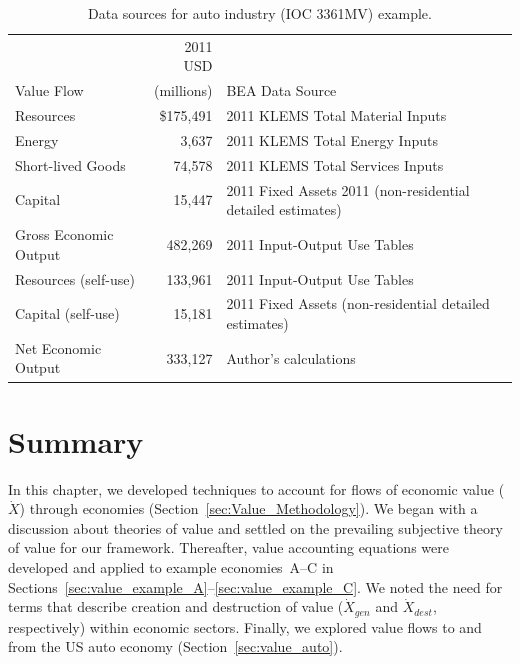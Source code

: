 \begin{table}
\caption[Data Sources for auto industry (IOC 3361MV) example]{Data sources for auto industry (IOC 3361MV) example.}
\begin{center}
  \begin{tabular}{l r @{\hspace{2em}} l}
   \toprule 
     & 2011 USD &   \\ 
Value Flow & (millions) & BEA Data Source \\
	\midrule
    Resources  & \$175,491           & 2011 KLEMS Total Material Inputs \\

   Energy &   3,637&   2011 KLEMS Total Energy Inputs                \\

    Short-lived Goods &   74,578 &   2011 KLEMS Total Services Inputs    \\
    Capital &  15,447  &  2011 Fixed Assets 2011 (non-residential detailed estimates)     \\  

    Gross Economic Output & 482,269  &   2011 Input-Output Use Tables \\

    Resources (self-use)  &  133,961 & 2011 Input-Output Use Tables     \\
    Capital (self-use) & 15,181 & 2011 Fixed Assets (non-residential detailed estimates)      \\
    Net Economic Output & 333,127   &  Author's calculations \\
    \bottomrule
  \end{tabular}

\end{center}
\label{tab:data}
\end{table}


\section{Summary}
\label{sec:value_summary}

In this chapter, we developed techniques to account for flows of economic value
($\dot{X}$) through economies 
(Section~\ref{sec:Value_Methodology}).
We began with a discussion about theories of value and settled on
the prevailing subjective theory of value for our framework.
Thereafter, value accounting equations were developed and applied to example
economies~A--C %
in Sections~\ref{sec:value_example_A}--\ref{sec:value_example_C}. 
We noted the need for terms that describe creation and destruction
of value ($\dot{X}_{gen}$ and $\dot{X}_{dest}$, respectively) 
within economic sectors.
Finally, we explored value flows 
to and from the US auto economy (Section~\ref{sec:value_auto}).

